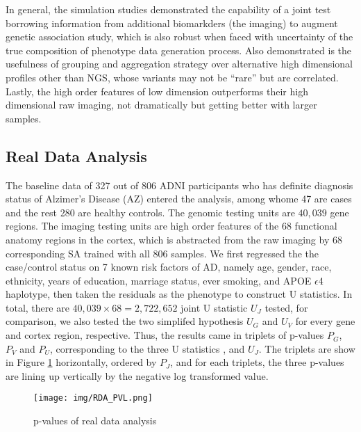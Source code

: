 In general, the simulation studies demonstrated the capability of a joint test borrowing information from additional biomarkders (the imaging) to augment genetic association study, which is also robust when faced with uncertainty of the true composition of phenotype data generation process. Also demonstrated is the usefulness of grouping and aggregation strategy over alternative high dimensional profiles other than NGS, whose variants may not be ``rare'' but are correlated. Lastly, the high order features of low dimension outperforms their high dimensional raw imaging, not dramatically but getting better with larger samples.

\subsection{Real Data Analysis}
The baseline data of 327 out of 806 ADNI participants who has definite diagnosis status of Alzimer's Disease (AZ) entered the analysis, among whome 47 are cases and the rest 280 are healthy controls. The genomic testing units are $40,039$ gene regions. The imaging testing units are high order features of the 68 functional anatomy regions in the cortex, which is abstracted from the raw imaging by 68 corresponding SA trained with all 806 samples. We first regressed the the case/control status on 7 known risk factors of AD, namely age, gender, race, ethnicity, years of education, marriage status, ever smoking, and APOE $\epsilon$4 haplotype, then taken the residuals as the phenotype to construct U statistics. In total, there are $40,039 \times 68 = 2,722,652$ joint U statistic $U_J$ tested, for comparison, we also tested the two simplifed hypothesis $U_G$ and $U_V$ for every gene and cortex region, respective. Thus, the results came in triplets of p-values $P_G$, $P_V$ and $P_U$, corresponding to the three U statistics , and $U_J$. The triplets are show in Figure \ref{fig:RDA_PVL} horizontally, ordered by $P_J$, and for each triplets, the three p-values are lining up vertically by the negative log transformed value.
\begin{figure}[!htbp]
\centering
\texttt{[image: img/RDA\_PVL.png]}
\caption{p-values of real data analysis}
\label{fig:RDA_PVL}
\end{figure}
